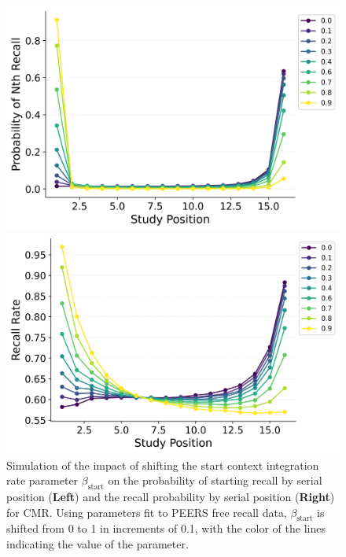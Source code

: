 \documentclass[
  man,
  floatsintext,
  longtable,
  nolmodern,
  notxfonts,
  notimes,
  draftfirst,
  colorlinks=true,linkcolor=blue,citecolor=blue,urlcolor=blue]{apa7}
\begin{document}
\begin{figure}

\caption{\label{fig-shiftstart}Simulation of the impact of shifting the
start context integration rate parameter \(\beta_\text{start}\) on the
probability of starting recall by serial position (\textbf{Left}) and
the recall probability by serial position (\textbf{Right}) for CMR.
Using parameters fit to PEERS free recall data, \(\beta_\text{start}\)
is shifted from 0 to 1 in increments of 0.1, with the color of the lines
indicating the value of the parameter.}

\begin{minipage}{0.50\linewidth}
\includegraphics{shifting/BaseCMR_Start_Drift_Rate_Parameter_Shifting_pnr_HealeyKahana2014.png}\end{minipage}%
%
\begin{minipage}{0.50\linewidth}
\includegraphics{shifting/BaseCMR_Start_Drift_Rate_Parameter_Shifting_spc_HealeyKahana2014.png}\end{minipage}%

\end{figure}%
\end{document}
